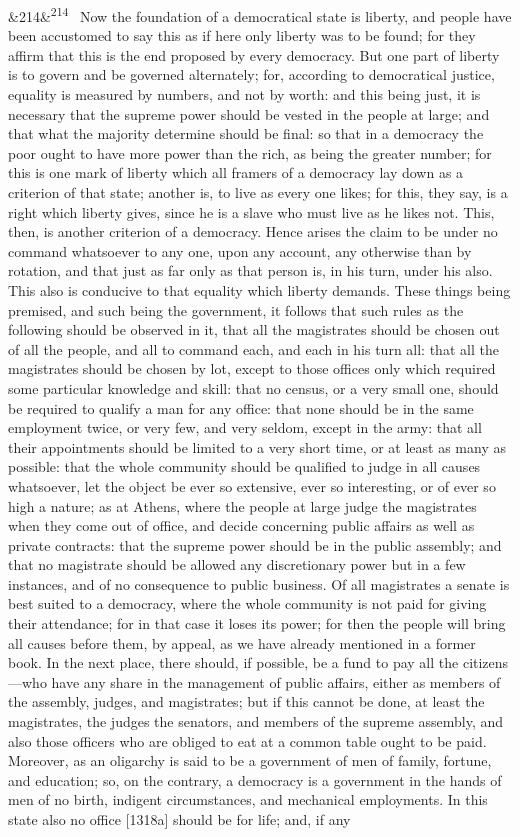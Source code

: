\documentclass[12pt]{article}
\newcommand{\para}[1][]{\par\noindent\ifx&#1&\else\textsuperscript{\footnotesize #1}~\fi}
\begin{document}
\para[214] Now the foundation of a democratical state is liberty, and people have been accustomed to say this as if here only liberty was to be found; for they affirm that this is the end proposed by every democracy. But one part of liberty is to govern and be governed alternately; for, according to democratical justice, equality is measured by numbers, and not by worth: and this being just, it is necessary that the supreme power should be vested in the people at large; and that what the majority determine should be final: so that in a democracy the poor ought to have more power than the rich, as being the greater number; for this is one mark of liberty which all framers of a democracy lay down as a criterion of that state; another is, to live as every one likes; for this, they say, is a right which liberty gives, since he is a slave who must live as he likes not. This, then, is another criterion of a democracy. Hence arises the claim to be under no command whatsoever to any one, upon any account, any otherwise than by rotation, and that just as far only as that person is, in his turn, under his also. This also is conducive to that equality which liberty demands. These things being premised, and such being the government, it follows that such rules as the following should be observed in it, that all the magistrates should be chosen out of all the people, and all to command each, and each in his turn all: that all the magistrates should be chosen by lot, except to those offices only which required some particular knowledge and skill: that no census, or a very small one, should be required to qualify a man for any office: that none should be in the same employment twice, or very few, and very seldom, except in the army: that all their appointments should be limited to a very short time, or at least as many as possible: that the whole community should be qualified to judge in all causes whatsoever, let the object be ever so extensive, ever so interesting, or of ever so high a nature; as at Athens, where the people at large judge the magistrates when they come out of office, and decide concerning public affairs as well as private contracts: that the supreme power should be in the public assembly; and that no magistrate should be allowed any discretionary power but in a few instances, and of no consequence to public business. Of all magistrates a senate is best suited to a democracy, where the whole community is not paid for giving their attendance; for in that case it loses its power; for then the people will bring all causes before them, by appeal, as we have already mentioned in a former book. In the next place, there should, if possible, be a fund to pay all the citizens---who have any share in the management of public affairs, either as members of the assembly, judges, and magistrates; but if this cannot be done, at least the magistrates, the judges the senators, and members of the supreme assembly, and also those officers who are obliged to eat at a common table ought to be paid. Moreover, as an oligarchy is said to be a government of men of family, fortune, and education; so, on the contrary, a democracy is a government in the hands of men of no birth, indigent circumstances, and mechanical employments. In this state also no office [1318a] should be for life; and, if any 
\end{document}
